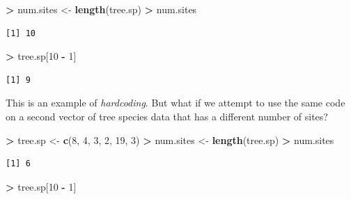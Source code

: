 \documentclass[
]{krantz}
\makeatletter
\newenvironment{Shaded}{\begin{snugshade}}{\end{snugshade}}
\newcommand{\DecValTok}[1]{\textcolor[rgb]{0.06,0.06,0.06}{#1}}
\newcommand{\KeywordTok}[1]{\textcolor[rgb]{0.27,0.27,0.27}{\textbf{#1}}}
\newcommand{\NormalTok}[1]{#1}
\newcommand{\OperatorTok}[1]{\textcolor[rgb]{0.43,0.43,0.43}{\textbf{#1}}}
\newcommand{\StringTok}[1]{\textcolor[rgb]{0.5,0.5,0.5}{#1}}
\newenvironment{kframe}{%
\medskip{}
\setlength{\fboxsep}{.8em}
 \def\at@end@of@kframe{}%
 \ifinner\ifhmode%
  \def\at@end@of@kframe{\end{minipage}}%
  \begin{minipage}{\columnwidth}%
 \fi\fi%
 \def\FrameCommand##1{\hskip\@totalleftmargin \hskip-\fboxsep
 \colorbox{shadecolor}{##1}\hskip-\fboxsep
     \hskip-\linewidth \hskip-\@totalleftmargin \hskip\columnwidth}%
 \MakeFramed {\advance\hsize-\width
   \@totalleftmargin\z@ \linewidth\hsize
   \@setminipage}}%
 {\par\unskip\endMakeFramed%
 \at@end@of@kframe}
\renewenvironment{Shaded}{\begin{kframe}}{\end{kframe}}
\makeatother
\begin{document}
\begin{Shaded}
\begin{Highlighting}[]
\OperatorTok{\textgreater{}}\StringTok{ }\NormalTok{num.sites \textless{}{-}}\StringTok{ }\KeywordTok{length}\NormalTok{(tree.sp)}
\OperatorTok{\textgreater{}}\StringTok{ }\NormalTok{num.sites}
\end{Highlighting}
\end{Shaded}

\begin{verbatim}
[1] 10
\end{verbatim}

\begin{Shaded}
\begin{Highlighting}[]
\OperatorTok{\textgreater{}}\StringTok{ }\NormalTok{tree.sp[}\DecValTok{10} \OperatorTok{{-}}\StringTok{ }\DecValTok{1}\NormalTok{]}
\end{Highlighting}
\end{Shaded}

\begin{verbatim}
[1] 9
\end{verbatim}

This is an example of \emph{hardcoding}. But what if we attempt to use the same code on a second vector of tree species data that has a different number of sites?

\begin{Shaded}
\begin{Highlighting}[]
\OperatorTok{\textgreater{}}\StringTok{ }\NormalTok{tree.sp \textless{}{-}}\StringTok{ }\KeywordTok{c}\NormalTok{(}\DecValTok{8}\NormalTok{, }\DecValTok{4}\NormalTok{, }\DecValTok{3}\NormalTok{, }\DecValTok{2}\NormalTok{, }\DecValTok{19}\NormalTok{, }\DecValTok{3}\NormalTok{)}
\OperatorTok{\textgreater{}}\StringTok{ }\NormalTok{num.sites \textless{}{-}}\StringTok{ }\KeywordTok{length}\NormalTok{(tree.sp)}
\OperatorTok{\textgreater{}}\StringTok{ }\NormalTok{num.sites}
\end{Highlighting}
\end{Shaded}

\begin{verbatim}
[1] 6
\end{verbatim}

\begin{Shaded}
\begin{Highlighting}[]
\OperatorTok{\textgreater{}}\StringTok{ }\NormalTok{tree.sp[}\DecValTok{10} \OperatorTok{{-}}\StringTok{ }\DecValTok{1}\NormalTok{]}
\end{Highlighting}
\end{Shaded}
\end{document}
